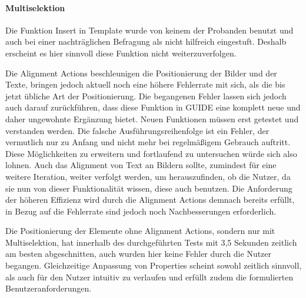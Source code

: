 \paragraph{Multiselektion}
Die Funktion \glqq Insert in Template\grqq{} wurde von keinem der Probanden benutzt und auch bei einer nachträglichen Befragung als nicht hilfreich eingestuft.
Deshalb erscheint es hier sinnvoll diese Funktion nicht weiterzuverfolgen.

Die Alignment Actions beschleunigen die Positionierung der Bilder und der Texte, bringen jedoch aktuell noch eine höhere Fehlerrate mit sich, als die bis jetzt übliche Art der Positionierung.
Die begangenen Fehler lassen sich jedoch auch darauf zurückführen, dass diese Funktion in GUIDE eine komplett neue und daher ungewohnte Ergänzung bietet.
Neuen Funktionen müssen erst getestet und verstanden werden.
Die falsche Ausführungsreihenfolge ist ein Fehler, der vermutlich nur zu Anfang und nicht mehr bei regelmäßigem Gebrauch auftritt.
Diese Möglichkeiten zu erweitern und fortlaufend zu untersuchen würde sich also lohnen.
Auch das Alignment von Text an Bildern sollte, zumindest für eine weitere Iteration, weiter verfolgt werden, um herauszufinden, ob die Nutzer, da sie nun von dieser Funktionalität wissen, diese auch benutzen.
Die Anforderung der höheren Effizienz wird durch die Alignment Actions demnach bereits erfüllt, in Bezug auf die Fehlerrate sind jedoch noch Nachbesserungen erforderlich.

Die Positionierung der Elemente ohne Alignment Actions, sondern nur mit Multiselektion, hat innerhalb des durchgeführten Tests  mit 3,5 Sekunden zeitlich am besten abgeschnitten, auch wurden hier keine Fehler durch die Nutzer begangen.
Gleichzeitige Anpassung von Properties scheint sowohl zeitlich sinnvoll, als auch für den Nutzer intuitiv zu verlaufen und erfüllt zudem die formulierten Benutzeranforderungen.

